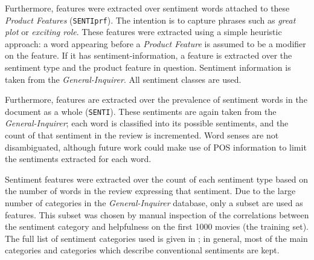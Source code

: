 \documentclass[letter,10pt]{article}
\begin{document}
Furthermore, features were extracted over sentiment words attached to these
	{\em Product Features} ({\tt SENTIprf}).
The intention is to capture phrases such as {\em great plot} or
	{\em exciting role}.
These features were extracted using a simple heuristic approach:
a word appearing before a {\em Product Feature} is assumed to be a modifier
	on the feature.
If it has sentiment-information, a feature is extracted over the sentiment
	type and the product feature in question.
Sentiment information is taken from the {\em General-Inquirer}.
All sentiment classes are used.

Furthermore, features are extracted over the prevalence of sentiment words
	in the document as a whole ({\tt SENTI}).
These sentiments are again taken from the {\em General-Inquirer};
	each word is classified into its possible sentiments, and the count
	of that sentiment in the review is incremented.
Word senses are not disambiguated, although future work could make use of
	POS information to limit the sentiments extracted for each word.

Sentiment features were extracted over the count of each 
	sentiment type based on the number of words in the review
	expressing that sentiment.
Due to the large number of categories in the {\em General-Inquirer} database,
	only a subset are used as features.
This subset was chosen by manual inspection of the correlations between
	the sentiment category and helpfulness on the first 1000 movies
	(the training set).
The full list of sentiment categories used is given in ;
	in general, most of the main categories and categories which
	describe conventional sentiments are kept.
\end{document}
